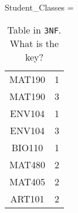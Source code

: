 \documentclass{article}
\begin{document}
\begin{table}[h!]
\caption{Table  in \texttt{3NF}.  What is the key?
   }
\begin{center}

Student\_Classes = \begin{tabular}{|c|c|}
   \hline
  \cellcolor{excel}{Class}  & \cellcolor{excel}{StudentID}
  \\
   \hline
  MAT190  & 1  \\
      \hline
 MAT190  & 3  \\
      \hline
 
 ENV104 & 1  \\
      \hline
      
      
 ENV104 & 3  \\
      \hline
 


BIO110 & 1  \\
      \hline
      
 MAT480 & 2  \\
      \hline
      
 MAT405  & 2  \\
      \hline
      
 ART101 & 2  \\
      \hline
\end{tabular}
\end{center}
\label{tab:3nf}
\end{table}%
% 
% 
% 
   
\end{document}
